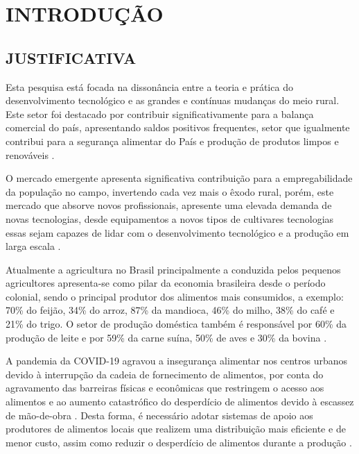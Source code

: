 \chapter{INTRODUÇÃO}



\section{JUSTIFICATIVA}

Esta pesquisa está focada na dissonância entre a teoria e prática do desenvolvimento tecnológico e as grandes e contínuas mudanças do meio rural. Este setor foi destacado por contribuir significativamente para a balança comercial do país, apresentando saldos positivos frequentes, setor que igualmente contribui para a segurança alimentar do País e produção de produtos limpos e renováveis \cite{souza_agricultura_2014}. 

O mercado emergente apresenta significativa contribuição para a empregabilidade da população no campo, invertendo cada vez mais o êxodo rural, porém, este mercado que absorve novos profissionais, apresente uma elevada demanda de novas tecnologias, desde equipamentos a novos tipos de cultivares tecnologias essas sejam capazes de lidar com o desenvolvimento tecnológico e a produção em larga escala \cite{de_souza_modernizacao_2019}. 

Atualmente a agricultura no Brasil principalmente a conduzida pelos pequenos agricultores apresenta-se como pilar da economia brasileira desde o período colonial, sendo o principal produtor dos alimentos mais consumidos, a exemplo: 70\% do feijão, 34\% do arroz, 87\% da mandioca, 46\% do milho, 38\% do café e 21\% do trigo. O setor de produção doméstica também é responsável por 60\% da produção de leite e por 59\% da carne suína, 50\% de aves e 30\% da bovina \cite{ibge_censo_2018}. 

A pandemia da COVID-19 agravou a insegurança alimentar nos centros urbanos devido à interrupção da cadeia de fornecimento de alimentos, por conta do agravamento das barreiras físicas e econômicas que restringem o acesso aos alimentos e ao aumento catastrófico do desperdício de alimentos devido à escassez de mão-de-obra \cite{zurayk_pandemic_2020}. Desta forma, é necessário adotar sistemas de apoio aos produtores de alimentos locais que realizem uma distribuição mais eficiente e de menor custo, assim como reduzir o desperdício de alimentos durante a produção \cite{brondeau_office_2018}. 

